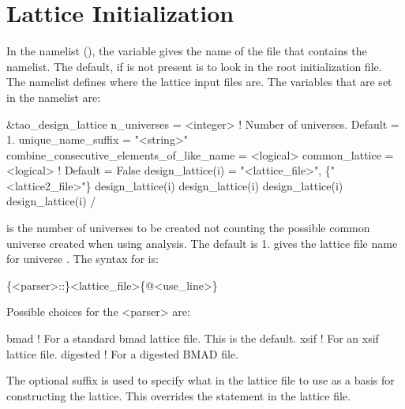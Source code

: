\section{Lattice Initialization}
\label{s:init.lat} 

In the  namelist (), the  variable gives the name
of the file that contains the  namelist. The default, if  is
not present is to look in the \tao root initialization file. The  namelist
defines where the lattice input files are. The variables that are set in the 
namelist are:
\begin{example}
  &tao_design_lattice
    n_universes        = <integer>      ! Number of universes. Default = 1.
    unique_name_suffix = "<string>"
    combine_consecutive_elements_of_like_name = <logical>
    common_lattice = <logical>                        ! Default = False
    design_lattice(i) = "<lattice_file>", \{"<lattice2_file>"\}
    design_lattice(i)%
    design_lattice(i)%
    design_lattice(i)%
    design_lattice(i)%
  /
\end{example}

 is the number of universes to be created not counting the possible common universe
created when using  analysis. The default is 1.   gives the lattice
file name for universe .  The syntax for  is:
\begin{example}
  \{<parser>::\}<lattice_file>\{@<use_line>\}
\end{example}
Possible choices for the <parser> are:
\begin{example}
  bmad      ! For a standard bmad lattice file. This is the default.
  xsif      ! For an xsif lattice file.
  digested  ! For a digested BMAD file.
\end{example}
The  optional suffix is used to specify what  in the lattice file to use as
a basis for constructing the lattice. This overrides the  statement in the lattice file.

